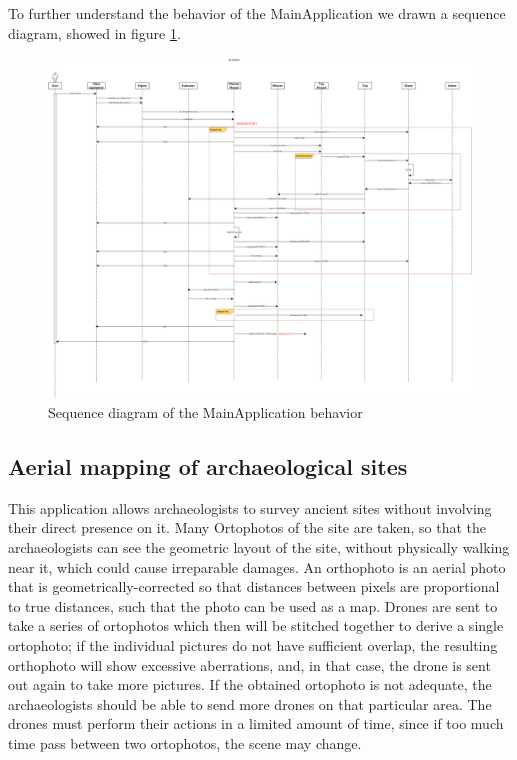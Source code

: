 To further understand the behavior of the MainApplication we drawn a sequence diagram, showed in figure \ref{fig:alfalfaSequence}.

\begin{figure}[H]
  \centering
  \includegraphics[width=\linewidth]{pictures/Alfalfa_Sequence.png}
  \caption{Sequence diagram of the MainApplication behavior}
  \label{fig:alfalfaSequence}
\end{figure}

\subsection{Aerial mapping of archaeological sites}\label{aerialMapping}

This application allows archaeologists to survey ancient sites without involving their direct presence on it.
Many Ortophotos of the site are taken, so that the archaeologists can see the geometric layout of the site, without physically walking near it, which could cause irreparable damages.
An orthophoto is an aerial photo that is geometrically-corrected so that distances between pixels are proportional to true distances, such that the photo can be used as a map.
Drones are sent to take a series of ortophotos which then will be stitched together to derive a single ortophoto; if the individual pictures do not have sufficient overlap, the resulting orthophoto will show excessive aberrations, and, in that case, the drone is sent out again to take more pictures.
If the obtained ortophoto is not adequate, the archaeologists should be able to send more drones on that particular area.
The drones must perform their actions in a limited amount of time, since if too much time pass between two ortophotos, the scene may change.

